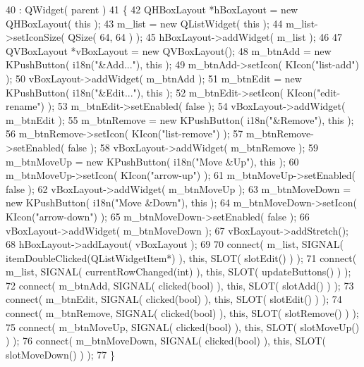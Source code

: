 \begin{DoxyCode}
40     : QWidget( parent )
41 \{
42     QHBoxLayout *hBoxLayout = \textcolor{keyword}{new} QHBoxLayout( \textcolor{keyword}{this} );
43     m\_list = \textcolor{keyword}{new} QListWidget( \textcolor{keyword}{this} );
44     m\_list->setIconSize( QSize( 64, 64 ) );
45     hBoxLayout->addWidget( m\_list );
46 
47     QVBoxLayout *vBoxLayout = \textcolor{keyword}{new} QVBoxLayout();
48     m\_btnAdd = \textcolor{keyword}{new} KPushButton( i18n(\textcolor{stringliteral}{"&Add..."}), \textcolor{keyword}{this} );
49     m\_btnAdd->setIcon( KIcon(\textcolor{stringliteral}{"list-add"}) );
50     vBoxLayout->addWidget( m\_btnAdd );
51     m\_btnEdit = \textcolor{keyword}{new} KPushButton( i18n(\textcolor{stringliteral}{"&Edit..."}), \textcolor{keyword}{this} );
52     m\_btnEdit->setIcon( KIcon(\textcolor{stringliteral}{"edit-rename"}) );
53     m\_btnEdit->setEnabled( \textcolor{keyword}{false} );
54     vBoxLayout->addWidget( m\_btnEdit );
55     m\_btnRemove = \textcolor{keyword}{new} KPushButton( i18n(\textcolor{stringliteral}{"&Remove"}), \textcolor{keyword}{this} );
56     m\_btnRemove->setIcon( KIcon(\textcolor{stringliteral}{"list-remove"}) );
57     m\_btnRemove->setEnabled( \textcolor{keyword}{false} );
58     vBoxLayout->addWidget( m\_btnRemove );
59     m\_btnMoveUp = \textcolor{keyword}{new} KPushButton( i18n(\textcolor{stringliteral}{"Move &Up"}), \textcolor{keyword}{this} );
60     m\_btnMoveUp->setIcon( KIcon(\textcolor{stringliteral}{"arrow-up"}) );
61     m\_btnMoveUp->setEnabled( \textcolor{keyword}{false} );
62     vBoxLayout->addWidget( m\_btnMoveUp );
63     m\_btnMoveDown = \textcolor{keyword}{new} KPushButton( i18n(\textcolor{stringliteral}{"Move &Down"}), \textcolor{keyword}{this} );
64     m\_btnMoveDown->setIcon( KIcon(\textcolor{stringliteral}{"arrow-down"}) );
65     m\_btnMoveDown->setEnabled( \textcolor{keyword}{false} );
66     vBoxLayout->addWidget( m\_btnMoveDown );
67     vBoxLayout->addStretch();
68     hBoxLayout->addLayout( vBoxLayout );
69 
70     connect( m\_list, SIGNAL( itemDoubleClicked(QListWidgetItem*) ), \textcolor{keyword}{this}, SLOT( slotEdit() ) );
71     connect( m\_list, SIGNAL( currentRowChanged(\textcolor{keywordtype}{int}) ), \textcolor{keyword}{this}, SLOT( updateButtons() ) );
72     connect( m\_btnAdd, SIGNAL( clicked(\textcolor{keywordtype}{bool}) ), \textcolor{keyword}{this}, SLOT( slotAdd() ) );
73     connect( m\_btnEdit, SIGNAL( clicked(\textcolor{keywordtype}{bool}) ), \textcolor{keyword}{this}, SLOT( slotEdit() ) );
74     connect( m\_btnRemove, SIGNAL( clicked(\textcolor{keywordtype}{bool}) ), \textcolor{keyword}{this}, SLOT( slotRemove() ) );
75     connect( m\_btnMoveUp, SIGNAL( clicked(\textcolor{keywordtype}{bool}) ), \textcolor{keyword}{this}, SLOT( slotMoveUp() ) );
76     connect( m\_btnMoveDown, SIGNAL( clicked(\textcolor{keywordtype}{bool}) ), \textcolor{keyword}{this}, SLOT( slotMoveDown() ) );
77 \}
\end{DoxyCode}
